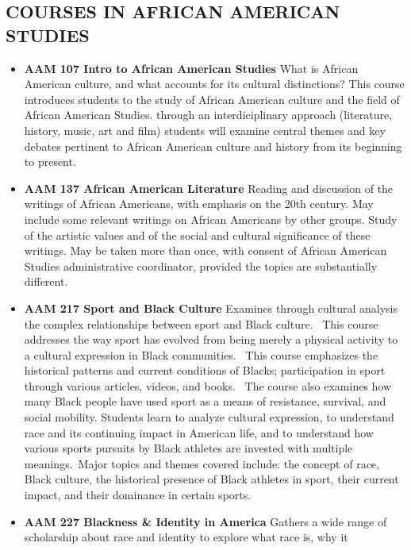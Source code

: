 \documentclass[
  letterpaper,
]{scrbook}
\providecommand{\tightlist}{%
  \setlength{\itemsep}{0pt}\setlength{\parskip}{0pt}}
\begin{document}
\subsection{COURSES IN AFRICAN AMERICAN
STUDIES}\label{courses-in-african-american-studies}

\begin{itemize}
\tightlist
\item
  \textbf{AAM 107 Intro to African American Studies} What is African
  American culture, and what accounts for its cultural distinctions?
  This course introduces students to the study of African American
  culture and the field of African American Studies. through an
  interdiciplinary approach (literature, history, music, art and film)
  students will examine central themes and key debates pertinent to
  African American culture and history from its beginning to present.
\item
  \textbf{AAM 137 African American Literature} Reading and discussion of
  the writings of African Americans, with emphasis on the 20th century.
  May include some relevant writings on African Americans by other
  groups. Study of the artistic values and of the social and cultural
  significance of these writings. May be taken more than once, with
  consent of African American Studies administrative coordinator,
  provided the topics are substantially different.
\item
  \textbf{AAM 217 Sport and Black Culture} Examines through cultural
  analysis the complex relationships between sport and Black culture.~
  This course addresses the way sport has evolved from being merely a
  physical activity to a cultural expression in Black communities.~ This
  course emphasizes the historical patterns and current conditions of
  Blacks; participation in sport through various articles, videos, and
  books.~ The course also examines how many Black people have used sport
  as a means of resistance, survival, and social mobility. Students
  learn to analyze cultural expression, to understand race and its
  continuing impact in American life, and to understand how various
  sports pursuits by Black athletes are invested with multiple
  meanings.~Major topics and themes covered include: the concept of
  race, Black culture, the historical presence of Black athletes in
  sport, their current impact, and their dominance in certain sports.
\item
  \textbf{AAM 227 Blackness \& Identity in America} Gathers a wide range
  of scholarship about race and identity to explore what race is, why it

\end{itemize}
\end{document}
